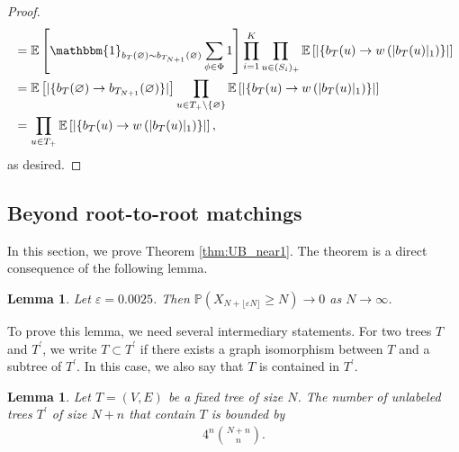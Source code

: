 \documentclass[11pt]{article}
\numberwithin{equation}{section}
\DeclareMathOperator{\N}{\mathbb{N}} %
\newcommand{\p}{\mathbb{P}} %
\newcommand{\E}{\mathbb{E}} %
\newcommand{\eps}{\varepsilon} %
\newcommand{\invisible}[1]{}
\newcommand{\basc}[1]{{\color{red}{ \bf [~Bas:\ }\emph{#1}\textbf{~]}}}
\newtheorem{lemma}[theorem]{Lemma}
\theoremstyle{definition}
\begin{document}
\begin{proof}
\begin{align*}
    &
    = \E \left[ \mathbbm{1}_{b_T(\varnothing)\sim b_{T_{N+1}}(\varnothing)} \sum_{\phi \in \Phi} 1  \right] \prod_{i=1}^{K} \prod_{u\in (S_i)_+} \E \left[ | \{ b_T(u) \rightarrow w \left(|b_T(u)|_1\right) \}| \right]\\
    & =
    \E \left[ | \{ b_T(\varnothing) \rightarrow b_{T_{N+1}}(\varnothing) \}| \right] \prod_{u \in T_+ \setminus \{ \varnothing \} } \E \left[|\{ b_T(u) \rightarrow w \left(|b_T(u)|_1\right) \} | \right]
    \\
    &=
    \prod_{u\in T_+} \E \left[|\{ b_T(u) \rightarrow w \left(|b_T(u)|_1\right) \} | \right],
    \end{align*}
    as desired. 
\end{proof}


\subsection{Beyond root-to-root matchings}\label{sec:beyondroottoroot}


In this section, we prove Theorem \ref{thm:UB_near1}. The theorem is a direct consequence of the following lemma.
\begin{lemma}\label{lem:upper bound eps}
	Let $\eps=0.0025$. Then $\p \left(X_{N + \lfloor \eps N \rfloor} \geq N \right) \to 0$ as $N\to \infty$.
 \invisible{ 
 \basc{This can be strengthened to: There exists a (random) $N_0\in\N$ such that $X_{(1+\eps)N}<N$ for all $N\geq N_0$ almost surely. We can also improve the bound on $\eps $ to $\eps<0.0327952$.}
 }
\end{lemma}

\noindent To prove this lemma, we need several intermediary statements. For two trees $T$ and $T^\prime$, we write $T \subset T^\prime$ if there exists a graph isomorphism between $T$ and a subtree of $T^\prime$. In this case, we also say that $T$ is contained in $T^\prime$.

\begin{lemma}\label{lem:tree_count}
    Let $T=(V,E)$ be a fixed tree of size $N$. The number of unlabeled trees $T^\prime$ of size $N+n$ that contain $T$ is bounded by
    \begin{align*}
        4^n \binom{N+n}{n}. 
    \end{align*}
\end{lemma}
\end{document}
